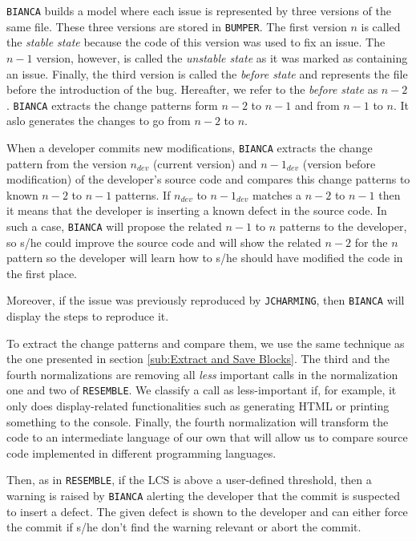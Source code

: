 {\tt BIANCA} builds a model where each issue is represented by three versions of the same file.
These three versions are stored in {\tt BUMPER}.
The first version $n$ is called the {\it stable state} because the code of this version was used to fix an issue.
The $n-1$ version, however, is called the {\it unstable state} as it was marked as containing an issue.
Finally, the third version is called the {\it before state} and represents the file before the introduction of the bug.
Hereafter, we refer to the {\it before state} as $n-2$.
{\tt BIANCA} extracts the change patterns form $n-2$ to $n-1$ and from $n-1$ to $n$.
It aslo generates the changes to go from $n-2$ to $n$.

When a developer commits new modifications, {\tt BIANCA} extracts the change pattern from the version $n_{dev}$ (current version) and $n-1_{dev}$ (version before modification) of the developer's source code and compares this change patterns to known $n-2$ to $n-1$ patterns.
If $n_{dev}$ to $n-1_{dev}$ matches a $n-2$ to $n-1$ then it means that the developer is inserting a known defect in the source code.
In such a case, {\tt BIANCA} will propose the related $n-1$ to $n$ patterns to the developer, so s/he could improve the source code and will show the related $n-2$ for the $n$ pattern so the developer will learn how to s/he should have modified the code in the first place.

Moreover, if the issue was previously reproduced by {\tt JCHARMING}, then {\tt BIANCA} will display the steps to reproduce it.


To extract the change patterns and compare them, we use the same technique as the one presented in section \ref{sub:Extract and Save Blocks}.
The third and the fourth normalizations are removing all {\it less} important calls in the normalization one and two of {\tt RESEMBLE}.
We classify a call as less-important if, for example, it only does display-related functionalities such as generating HTML or printing something to the console. Finally, the fourth normalization will transform the code to an intermediate language of our own that will allow us to compare source code implemented in different programming languages.

Then, as in {\tt RESEMBLE}, if the LCS is above a user-defined threshold, then a warning is raised by {\tt BIANCA} alerting the developer that the commit is suspected to insert a defect.
The given defect is shown to the developer and can either force the commit if s/he don't find the warning relevant or abort the commit.

